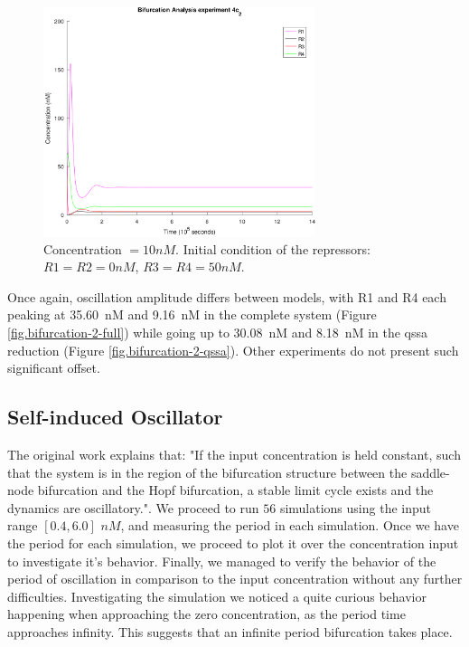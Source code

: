     \begin{figure}[!htbp]
      \centering
      \includegraphics[width=0.71\textwidth]{img/bifurcation-4c2-1.png}
      \caption{Concentration $= 10nM$. Initial condition of the repressors: $R1 = R2 = 0nM$, $R3 = R4 = 50nM$.}
      \label{fig.bifurcation-4c2}
    \end{figure}

    Once again, oscillation amplitude differs between models, with R1 and R4 each peaking at \SI{35.60}{\nano M} and \SI{9.16}{\nano M} in the complete system (Figure \ref{fig.bifurcation-2-full}) while going up to \SI{30.08}{\nano M} and \SI{8.18}{\nano M} in the \ac{qssa} reduction (Figure \ref{fig.bifurcation-2-qssa}).
    Other experiments do not present such significant offset.


  \subsection{Self-induced Oscillator}

    The original work explains that: "If the input concentration is held constant, such that the system is in the region of the bifurcation structure between the saddle-node bifurcation and the Hopf bifurcation, a stable limit cycle exists and the dynamics are oscillatory.". We proceed to run $56$ simulations using the input range $[0.4, 6.0]$ $nM$, and measuring the period in each simulation. Once we have the period for each simulation, we proceed to plot it over the concentration input to investigate it's behavior. Finally, we managed to verify the behavior of the period of oscillation in comparison to the input concentration without any further difficulties. Investigating the simulation we noticed a quite curious behavior happening when approaching the zero concentration, as the period time approaches infinity. This suggests that an infinite period bifurcation takes place.

